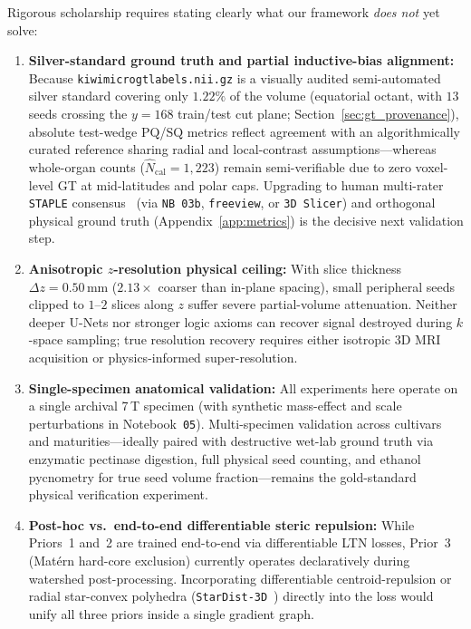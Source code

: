 \documentclass[10pt,a4paper]{article}
\renewcommand{\_}{\origunderscore\allowbreak}
\begin{document}
Rigorous scholarship requires stating clearly what our framework \emph{does not} yet solve:
\begin{enumerate}
    \item \textbf{Silver-standard ground truth and partial inductive-bias alignment:} Because \texttt{kiwi\_micro\_gt\_labels.nii.gz} is a visually audited semi-automated silver standard covering only $1.22\%$ of the volume (equatorial octant, with $13$ seeds crossing the $y=168$ train/test cut plane; Section~\ref{sec:gt_provenance}), absolute test-wedge $\text{PQ}$/$\text{SQ}$ metrics reflect agreement with an algorithmically curated reference sharing radial and local-contrast assumptions---whereas whole-organ counts ($\hat{N}_{\text{cal}} = 1{,}223$) remain semi-verifiable due to zero voxel-level GT at mid-latitudes and polar caps. Upgrading to human multi-rater \texttt{STAPLE} consensus~\cite{warfield2004staple} (via \texttt{NB 03b}, \texttt{freeview}, or \texttt{3D Slicer}) and orthogonal physical ground truth (Appendix~\ref{app:metrics}) is the decisive next validation step.
    \item \textbf{Anisotropic $z$-resolution physical ceiling:} With slice thickness $\Delta z = 0.50\,\text{mm}$ ($2.13\times$ coarser than in-plane spacing), small peripheral seeds clipped to $1\text{--}2$ slices along $z$ suffer severe partial-volume attenuation. Neither deeper U-Nets nor stronger logic axioms can recover signal destroyed during $k$-space sampling; true resolution recovery requires either isotropic 3D MRI acquisition or physics-informed super-resolution.
    \item \textbf{Single-specimen anatomical validation:} All experiments here operate on a single archival 7\,T specimen (with synthetic mass-effect and scale perturbations in Notebook~\texttt{05}). Multi-specimen validation across cultivars and maturities---ideally paired with destructive wet-lab ground truth via enzymatic pectinase digestion, full physical seed counting, and ethanol pycnometry for true seed volume fraction---remains the gold-standard physical verification experiment.
    \item \textbf{Post-hoc vs.\ end-to-end differentiable steric repulsion:} While Priors~1 and~2 are trained end-to-end via differentiable LTN losses, Prior~3 (Mat\'ern hard-core exclusion) currently operates declaratively during watershed post-processing. Incorporating differentiable centroid-repulsion or radial star-convex polyhedra (\texttt{StarDist-3D}~\cite{weigert2020stardist3d}) directly into the loss would unify all three priors inside a single gradient graph.

\end{enumerate}
\end{document}
